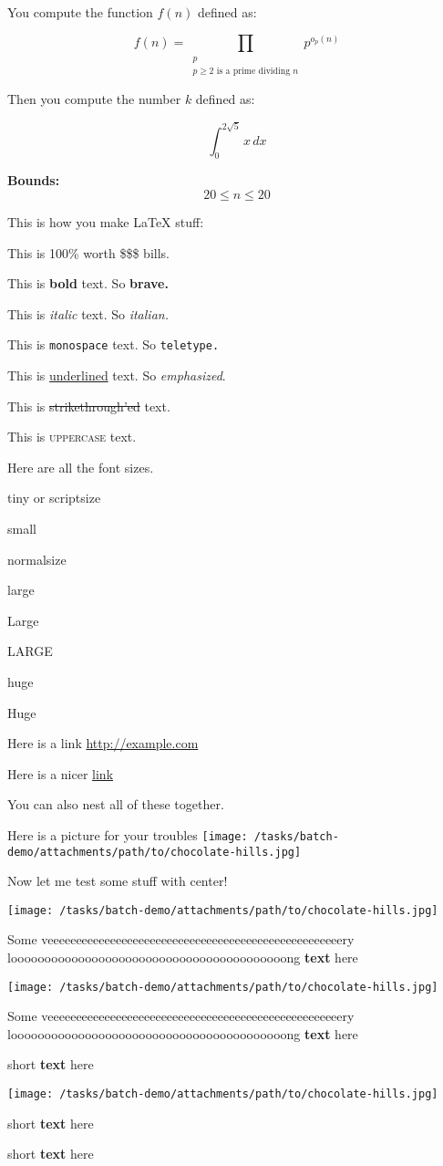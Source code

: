 You compute the function $f(n)$ defined as:

$$f(n) = \prod_{\substack{p \\ p \geq 2 \text{ is a prime dividing } n}} p^{o_p(n)}$$

Then you compute the number $k$ defined as:

\[\int_{0}^{2\sqrt{5}} x \, dx\]

\large{\bf{Bounds:}}
$$ 20 \le n \le 20 $$

This is how you make LaTeX stuff:

This is 100\% worth \$\$\$ bills.

This is \textbf{bold} text. So \bf{brave}.

This is \textit{italic} text. So \it{italian}.

This is \texttt{monospace} text. So \tt{teletype}.

This is \underline{underlined} text. So \emph{emphasized}.

This is \sout{strikethrough'ed} text.

This is \textsc{uppercase} text.

Here are all the font sizes.

\tiny{tiny} or \scriptsize{scriptsize}

\small{small}

\normalsize{normalsize}

\large{large}

\Large{Large}

\LARGE{LARGE}

\huge{huge}

\Huge{Huge}


Here is a link \url{http://example.com}

Here is a nicer \href{http://example.com}{link}

You can also nest all of these together. \href{http://example.com}{}

Here is a picture for your troubles \texttt{[image: /tasks/batch-demo/attachments/path/to/chocolate-hills.jpg]}

Now let me test some stuff with center!

\begin{center}
    \texttt{[image: /tasks/batch-demo/attachments/path/to/chocolate-hills.jpg]}
\end{center}


\begin{center}
    Some veeeeeeeeeeeeeeeeeeeeeeeeeeeeeeeeeeeeeeeeeeeeeeeeeeeery looooooooooooooooooooooooooooooooooooooooong \textbf{text} here

    \texttt{[image: /tasks/batch-demo/attachments/path/to/chocolate-hills.jpg]}


    Some veeeeeeeeeeeeeeeeeeeeeeeeeeeeeeeeeeeeeeeeeeeeeeeeeeeery looooooooooooooooooooooooooooooooooooooooong \textbf{text} here
\end{center}

\begin{center}
    short \textbf{text} here

    \texttt{[image: /tasks/batch-demo/attachments/path/to/chocolate-hills.jpg]}


    short \textbf{text} here
\end{center}


\begin{center}
    short \textbf{text} here
\end{center}
